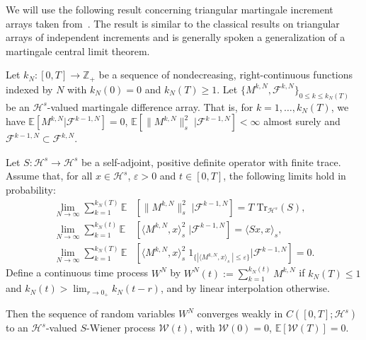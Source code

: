 We will use the following result concerning triangular martingale increment arrays taken from~\autocite{Berger1986}. The result is similar to the classical results on triangular arrays of independent increments and is generally spoken a generalization of a martingale central limit theorem.

Let $ k_{N}: [0,T] \to \mathbb{Z}_{+} $ be a sequence of nondecreasing, right-continuous functions indexed by $ N $ with $ k_{N}(0) = 0 $ and  $k_{N} (T) \geq 1 $. Let $ \{ M^{k,N}, \mathcal{F}^{k,N}  \}_{0 \leq k \leq k_{N}(T)} $ be an $ \mathcal{H}^s $-valued martingale difference array. That is, for $ k = 1,\dots , k_{N}(T) $, we have
$  \mathbb{E} \left[  M^{k,N} | \mathcal{F}^{k-1,N} \right] =  0 $,  $  \mathbb{E} \left[ \| M^{k,N} \|_{s}^{2} \; | \mathcal{F}^{k-1,N} \right] <  \infty $ almost surely
and $ \mathcal{F}^{k-1,N} \subset \mathcal{F}^{k,N} $.

\begin{proposition}\autocite[Theorem 5.1]{Berger1986}
\label{Martingale central limit theorem - Helping proposition}
  Let $ S : \mathcal{H}^s \to \mathcal{H}^s $ be a self-adjoint, positive definite operator with finite trace. Assume that, for all $ x \in \mathcal{H}^s $, $ \varepsilon > 0 $ and $ t \in [0,T] $, the following limits hold in probability:
  \begin{align}
   \lim_{N \to \infty} \sum_{k=1}^{k_{N}(T)} \mathbb{E} &\left[ \| M^{k,N} \|_{s}^{2}  \; | \mathcal{F}^{k-1,N} \right] = T \; \text{Tr}_{\mathcal{H}^s}(S), \label{MCLT - P1}\\
   \lim_{N \to \infty} \sum_{k=1}^{k_{N}(t)} \mathbb{E} &\left[ \langle  M^{k,N} , x \rangle_{s}^{2}  \; | \mathcal{F}^{k-1,N} \right] = \langle Sx , x \rangle_{s}, \label{MCLT - P2}\\
   \lim_{N \to \infty} \sum_{k=1}^{k_{N}(T)} \mathbb{E} &\left[ \langle M^{k,N} , x \rangle_{s}^{2} \; 1_{\{ | \langle M^{k,N} , x \rangle_s \; | \leq \varepsilon \}} | \mathcal{F}^{k-1,N} \right] = 0. \label{MCLT - P3}
  \end{align}
  Define a continuous time process $ W^{N} $ by $ W^{N}(t) := \sum_{k=1}^{k_{N}(t)} M^{k,N} $ if $ k_{N}(T) \leq 1 $ and $ k_{N}(t) > \lim_{r \to 0_+} k_N(t-r) $, and by linear interpolation otherwise.
  
  Then the sequence of random variables $ W^N $ converges weakly in $ C \left( [0,T]; \mathcal{H}^s \right) $ to an $ \mathcal{H}^s $-valued $S$-Wiener process $\mathcal{W}(t)$, with $ \mathcal{W}(0) = 0 $, $ \mathbb{E} [ \mathcal{W}(T) ] =  0 $.
  
\end{proposition}

